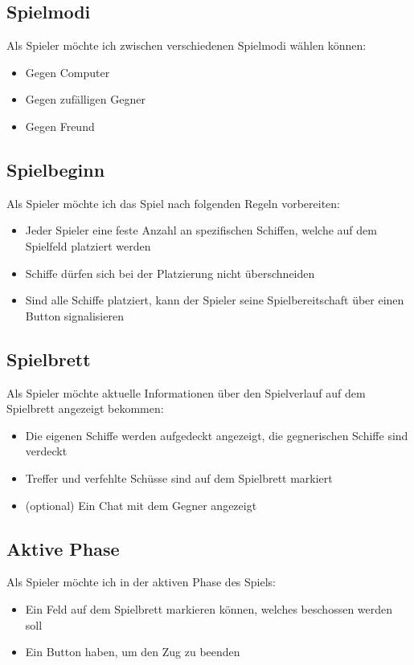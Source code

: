 \documentclass[a4paper, 10pt, conference]{IEEEtran}
\begin{document}
\subsection{Spielmodi}
Als Spieler möchte ich zwischen verschiedenen Spielmodi wählen können:
\begin{itemize}
	\item Gegen Computer
	\item Gegen zufälligen Gegner
	\item Gegen Freund
\end{itemize}

\subsection{Spielbeginn}
Als Spieler möchte ich das Spiel nach folgenden Regeln vorbereiten:
\begin{itemize}
	\item Jeder Spieler eine feste Anzahl an spezifischen Schiffen, welche auf dem Spielfeld platziert werden
	\item Schiffe dürfen sich bei der Platzierung nicht überschneiden
	\item Sind alle Schiffe platziert, kann der Spieler seine Spielbereitschaft über einen Button signalisieren
\end{itemize}

\subsection{Spielbrett}
Als Spieler möchte aktuelle Informationen über den Spielverlauf auf dem Spielbrett angezeigt bekommen:
\begin{itemize}
	\item Die eigenen Schiffe werden aufgedeckt angezeigt, die gegnerischen Schiffe sind verdeckt
	\item Treffer und verfehlte Schüsse sind auf dem Spielbrett markiert
	\item (optional) Ein Chat mit dem Gegner angezeigt
\end{itemize}

\subsection{Aktive Phase}
Als Spieler möchte ich in der aktiven Phase des Spiels:
\begin{itemize}
	\item Ein Feld auf dem Spielbrett markieren können, welches beschossen werden soll
	\item Ein Button haben, um den Zug zu beenden
\end{itemize}
\end{document}
